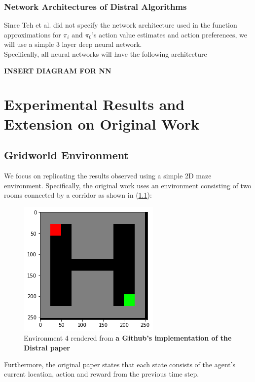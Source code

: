 \documentclass[12pt]{report}
\begin{document}
\subsection{Network Architectures of Distral Algorithms}

Since Teh et al. \cite{teh2017distral} did not specify the network architecture used in the function approximations for $\pi_i$ and $\pi_0$'s action value estimates and action preferences, we will use a simple 3 layer deep neural network.\\

Specifically, all neural networks will have the following architecture

\textbf{INSERT DIAGRAM FOR NN}




\chapter{Experimental Results and Extension on Original Work}
\section{Gridworld Environment}

We focus on replicating the results observed using a simple 2D maze environment. Specifically, the original work \cite{teh2017distral} uses an environment consisting of two rooms connected by a corridor as shown in (\ref{fig4.1}):
\begin{figure}[H]
    \center
    \includegraphics[width=0.3\linewidth]{figs/grid4.png}
    \caption{Environment 4 rendered from \textbf{a Github's implementation of the Distral paper}}
    \label{fig4.1}
\end{figure}
Furthermore, the original paper states that each state consists of the agent's current location, action and reward from the previous time step.\\
\end{document}
